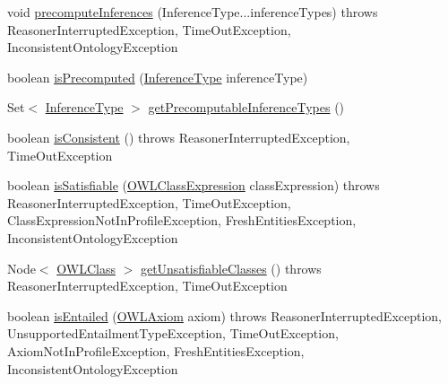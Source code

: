 \begin{DoxyCompactItemize}
\item 
void \hyperlink{classorg_1_1semanticweb_1_1owlapi_1_1reasoner_1_1structural_1_1_structural_reasoner_aa4ebe85aba9feb5ce15a83473fdddba5}{precompute\-Inferences} (Inference\-Type...\-inference\-Types)  throws Reasoner\-Interrupted\-Exception, Time\-Out\-Exception, Inconsistent\-Ontology\-Exception 
\item 
boolean \hyperlink{classorg_1_1semanticweb_1_1owlapi_1_1reasoner_1_1structural_1_1_structural_reasoner_a8a30047be380915e1a29c1e4be6729e3}{is\-Precomputed} (\hyperlink{enumorg_1_1semanticweb_1_1owlapi_1_1reasoner_1_1_inference_type}{Inference\-Type} inference\-Type)
\item 
Set$<$ \hyperlink{enumorg_1_1semanticweb_1_1owlapi_1_1reasoner_1_1_inference_type}{Inference\-Type} $>$ \hyperlink{classorg_1_1semanticweb_1_1owlapi_1_1reasoner_1_1structural_1_1_structural_reasoner_ad62a5e0777416920438e417ad9d5be48}{get\-Precomputable\-Inference\-Types} ()
\item 
boolean \hyperlink{classorg_1_1semanticweb_1_1owlapi_1_1reasoner_1_1structural_1_1_structural_reasoner_ae75d6a51dd6eb72352d850907a5a29ff}{is\-Consistent} ()  throws Reasoner\-Interrupted\-Exception, Time\-Out\-Exception 
\item 
boolean \hyperlink{classorg_1_1semanticweb_1_1owlapi_1_1reasoner_1_1structural_1_1_structural_reasoner_a403565edebc10cde887b5ae6b527e31b}{is\-Satisfiable} (\hyperlink{interfaceorg_1_1semanticweb_1_1owlapi_1_1model_1_1_o_w_l_class_expression}{O\-W\-L\-Class\-Expression} class\-Expression)  throws Reasoner\-Interrupted\-Exception, Time\-Out\-Exception, Class\-Expression\-Not\-In\-Profile\-Exception, Fresh\-Entities\-Exception, Inconsistent\-Ontology\-Exception 
\item 
Node$<$ \hyperlink{interfaceorg_1_1semanticweb_1_1owlapi_1_1model_1_1_o_w_l_class}{O\-W\-L\-Class} $>$ \hyperlink{classorg_1_1semanticweb_1_1owlapi_1_1reasoner_1_1structural_1_1_structural_reasoner_a2561002c485e974b6559e02607d38490}{get\-Unsatisfiable\-Classes} ()  throws Reasoner\-Interrupted\-Exception, Time\-Out\-Exception 
\item 
boolean \hyperlink{classorg_1_1semanticweb_1_1owlapi_1_1reasoner_1_1structural_1_1_structural_reasoner_af631678044aecb32065f6bab9d92d790}{is\-Entailed} (\hyperlink{interfaceorg_1_1semanticweb_1_1owlapi_1_1model_1_1_o_w_l_axiom}{O\-W\-L\-Axiom} axiom)  throws Reasoner\-Interrupted\-Exception, Unsupported\-Entailment\-Type\-Exception, Time\-Out\-Exception, Axiom\-Not\-In\-Profile\-Exception, Fresh\-Entities\-Exception, Inconsistent\-Ontology\-Exception 

\end{DoxyCompactItemize}
